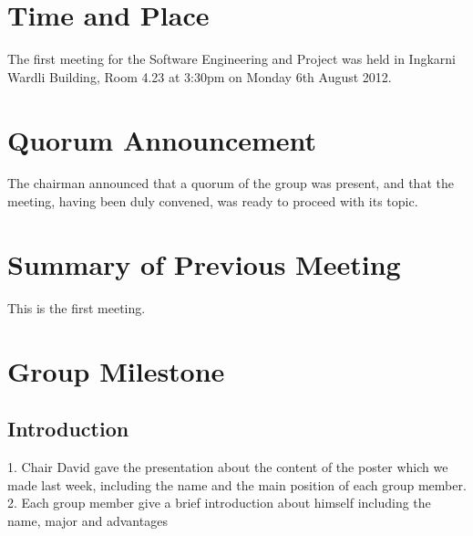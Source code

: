 \documentclass[11pt, a4paper]{article}
\begin{document}
\section{Time and Place}
The first meeting for the Software Engineering and Project was held in Ingkarni Wardli Building, Room     4.23 at 3:30pm on Monday 6th August 2012.

\section{Quorum Announcement}
The chairman announced that a quorum of the group was present, and that the meeting, having been duly convened, was ready to proceed with its topic.

\section{Summary of Previous Meeting}
This is the first meeting.

\section{Group Milestone}

\subsection{Introduction}
1. Chair David gave the presentation about the content of the poster which we made last week, including the name and the main position of each group member.\\
2. Each group member give a brief introduction about himself including the name, major and advantages
\end{document}
